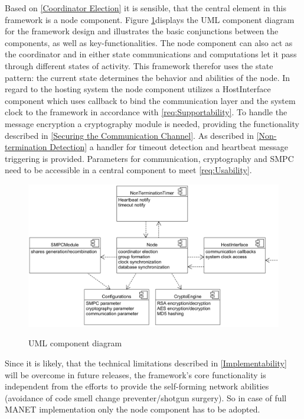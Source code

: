 	Based on \ref{Coordinator Election} it is sensible, that the central element in this framework is a node component. Figure \ref{figure:UML component diagram}displays the \gls{UML} component diagram for the framework design and illustrates the basic conjunctions between the components, as well as key-functionalities. The node component can also act as the coordinator and in either state communications and computations let it pass through different states of activity. This framework therefor uses the state pattern: the current state determines the behavior and abilities of the node.
	In regard to the hosting system the node component utilizes a HostInterface component which uses callback to bind the communication layer and the system clock to the framework in accordance with \ref{req:Supportability}. To handle the message encryption a cryptography module is needed, providing the functionality described in \ref{Securing the Communication Channel}. As described in \ref{Non-termination Detection} a handler for timeout detection and heartbeat message triggering is provided. Parameters for communication, cryptography and \gls{SMPC} need to be accessible in a central component to meet \ref{req:Usability}.
		
	\begin{figure}[!htbp] %
		\caption{\gls{UML} component diagram}
		\includegraphics[scale=1.0]{figures/uml-component.png}
		\label{figure:UML component diagram}
	\end{figure}
		
	Since it is likely, that the technical limitations described in \ref{Implementability} will be overcome in future releases, the framework's core functionality is independent from the efforts to provide the self-forming network abilities (avoidance of code smell change preventer/shotgun surgery). So in case of full \gls{MANET} implementation only the node component has to be adopted.
			
